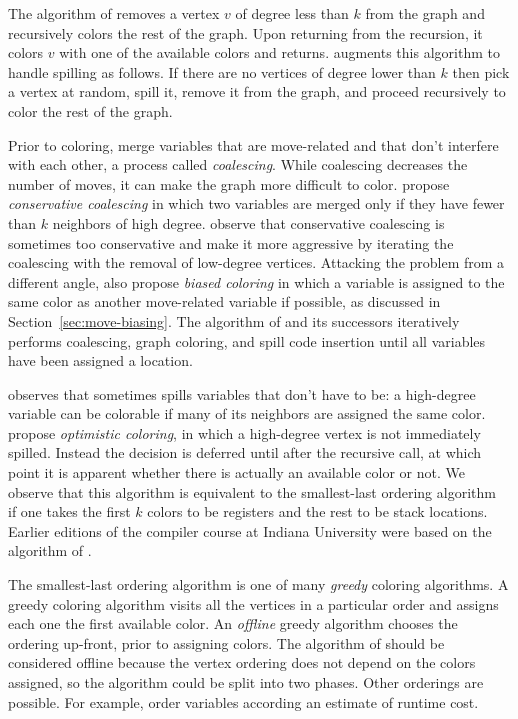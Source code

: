 \documentclass[11pt]{book}
\begin{document}
{The algorithm of \citet{Chaitin:1981vl} removes a vertex $v$ of degree
less than $k$ from the graph and recursively colors the rest of the
graph. Upon returning from the recursion, it colors $v$ with one of
the available colors and returns.  \citet{Chaitin:1982vn} augments
this algorithm to handle spilling as follows. If there are no vertices
of degree lower than $k$ then pick a vertex at random, spill it,
remove it from the graph, and proceed recursively to color the rest of
the graph.

Prior to coloring, \citet{Chaitin:1981vl} merge variables that are
move-related and that don't interfere with each other, a process
called \emph{coalescing}. While coalescing decreases the number of
moves, it can make the graph more difficult to
color. \citet{Briggs:1994kx} propose \emph{conservative coalescing} in
which two variables are merged only if they have fewer than $k$
neighbors of high degree. \citet{George:1996aa} observe that
conservative coalescing is sometimes too conservative and make it more
aggressive by iterating the coalescing with the removal of low-degree
vertices.
%
Attacking the problem from a different angle, \citet{Briggs:1994kx}
also propose \emph{biased coloring} in which a variable is assigned to
the same color as another move-related variable if possible, as
discussed in Section~\ref{sec:move-biasing}.
%
The algorithm of \citet{Chaitin:1981vl} and its successors iteratively
performs coalescing, graph coloring, and spill code insertion until
all variables have been assigned a location.

\citet{Briggs:1994kx} observes that \citet{Chaitin:1982vn} sometimes
spills variables that don't have to be: a high-degree variable can be
colorable if many of its neighbors are assigned the same color.
\citet{Briggs:1994kx} propose \emph{optimistic coloring}, in which a
high-degree vertex is not immediately spilled. Instead the decision is
deferred until after the recursive call, at which point it is apparent
whether there is actually an available color or not. We observe that
this algorithm is equivalent to the smallest-last ordering
algorithm~\citep{Matula:1972aa} if one takes the first $k$ colors to
be registers and the rest to be stack locations.
Earlier editions of the compiler course at Indiana University
\citep{Dybvig:2010aa} were based on the algorithm of
\citet{Briggs:1994kx}.

The smallest-last ordering algorithm is one of many \emph{greedy}
coloring algorithms. A greedy coloring algorithm visits all the
vertices in a particular order and assigns each one the first
available color. An \emph{offline} greedy algorithm chooses the
ordering up-front, prior to assigning colors. The algorithm of
\citet{Chaitin:1981vl} should be considered offline because the vertex
ordering does not depend on the colors assigned, so the algorithm
could be split into two phases.  Other orderings are possible. For
example, \citet{Chow:1984ys} order variables according an estimate of
runtime cost.

}
\end{document}
